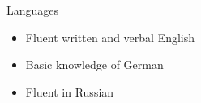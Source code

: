 \documentclass{resume} %
\begin{document}

\begin{rSection}{Languages}
\begin{itemize}
\item {Fluent written and verbal English}
\item {Basic knowledge of German}
\item {Fluent in Russian}
\end{itemize}

\end{rSection}


\end{document}
